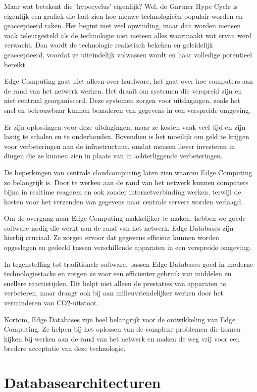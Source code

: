 Maar wat betekent die 'hypecyclus' eigenlijk? Wel, de Gartner Hype Cycle is eigenlijk een grafiek die laat zien hoe nieuwe technologieën populair worden en geaccepteerd raken. Het begint met veel opwinding, maar dan worden mensen vaak teleurgesteld als de technologie niet meteen alles waarmaakt wat ervan werd verwacht. Dan wordt de technologie realistisch bekeken en geleidelijk geaccepteerd, voordat ze uiteindelijk volwassen wordt en haar volledige potentieel bereikt.

Edge Computing gaat niet alleen over hardware, het gaat over hoe computers aan de rand van het netwerk werken. Het draait om systemen die verspreid zijn en niet centraal georganiseerd. Deze systemen zorgen voor uitdagingen, zoals het snel en betrouwbaar kunnen benaderen van gegevens in een verspreide omgeving.

Er zijn oplossingen voor deze uitdagingen, maar ze kosten vaak veel tijd en zijn lastig te schalen en te onderhouden. Bovendien is het moeilijk om geld te krijgen voor verbeteringen aan de infrastructuur, omdat mensen liever investeren in dingen die ze kunnen zien in plaats van in achterliggende verbeteringen.

De beperkingen van centrale cloudcomputing laten zien waarom Edge Computing zo belangrijk is. Door te werken aan de rand van het netwerk kunnen computers bijna in realtime reageren en ook zonder internetverbinding werken, terwijl de kosten voor het verzenden van gegevens naar centrale servers worden verlaagd.

Om de overgang naar Edge Computing makkelijker te maken, hebben we goede software nodig die werkt aan de rand van het netwerk. Edge Databases zijn hierbij cruciaal. Ze zorgen ervoor dat gegevens efficiënt kunnen worden opgeslagen en gedeeld tussen verschillende apparaten in een verspreide omgeving.

In tegenstelling tot traditionele software, passen Edge Databases goed in moderne technologiestacks en zorgen ze voor een efficiënter gebruik van middelen en snellere reactietijden. Dit helpt niet alleen de prestaties van apparaten te verbeteren, maar draagt ook bij aan milieuvriendelijker werken door het verminderen van CO2-uitstoot.

Kortom, Edge Databases zijn heel belangrijk voor de ontwikkeling van Edge Computing. Ze helpen bij het oplossen van de complexe problemen die komen kijken bij werken aan de rand van het netwerk en maken de weg vrij voor een bredere acceptatie van deze technologie.
\section{Databasearchitecturen}

